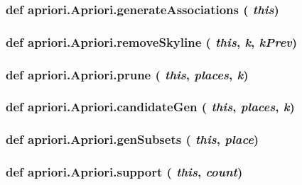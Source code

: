 \subsubsection{\setlength{\rightskip}{0pt plus 5cm}def apriori.Apriori.generate\-Associations ( {\em this})}\label{classapriori_1_1_apriori_f57bcf3d6d9d8f9e18213f7e4d63de9a}


\subsubsection{\setlength{\rightskip}{0pt plus 5cm}def apriori.Apriori.remove\-Skyline ( {\em this},  {\em k},  {\em k\-Prev})}\label{classapriori_1_1_apriori_091cbbc34b8b8eb43378107fd1c52d53}


\subsubsection{\setlength{\rightskip}{0pt plus 5cm}def apriori.Apriori.prune ( {\em this},  {\em places},  {\em k})}\label{classapriori_1_1_apriori_787d0f95b7949d72ee5052fc754e00f1}


\subsubsection{\setlength{\rightskip}{0pt plus 5cm}def apriori.Apriori.candidate\-Gen ( {\em this},  {\em places},  {\em k})}\label{classapriori_1_1_apriori_ea53de36089fb46fb386918299c356bb}


\subsubsection{\setlength{\rightskip}{0pt plus 5cm}def apriori.Apriori.gen\-Subsets ( {\em this},  {\em place})}\label{classapriori_1_1_apriori_ab778339a7c5d8582ac6202bf665811c}


\subsubsection{\setlength{\rightskip}{0pt plus 5cm}def apriori.Apriori.support ( {\em this},  {\em count})}\label{classapriori_1_1_apriori_74371d7896e488e3018e2fa3b2f18040}


